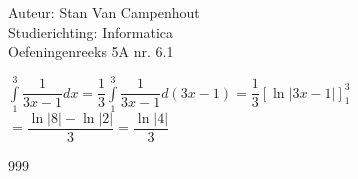 \documentclass[a4paper]{article}
\begin{document}
  
\noindent \large Auteur: Stan Van Campenhout \\
\noindent \large Studierichting:  Informatica\\
\noindent \large Oefeningenreeks 5A nr. 6.1\\

\medskip

\normalsize

$ \displaystyle\int\limits_1^3\dfrac{1}{3x-1}dx = \dfrac{1}{3}\displaystyle\int\limits_1^3\dfrac{1}{3x-1}d\left(3x-1\right) = \dfrac{1}{3}\left[\ln|3x-1|\right]_1^3 $\\

$ = \dfrac{\ln\left|8\right|-\ln\left|2\right|}{3} = \dfrac{\ln\left|4\right|}{3} $\\

\begin{thebibliography}{999}
\end{thebibliography}
\end{document}
